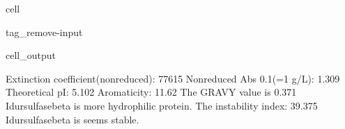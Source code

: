 \documentclass[letterpaper,10pt,english]{jupyterBook}
\begin{document}
\begin{sphinxuseclass}{cell}
\begin{sphinxuseclass}{tag_remove-input}
\begin{sphinxVerbatimOutput}
\begin{sphinxuseclass}{cell_output}
\begin{sphinxVerbatim}[commandchars=\\\{\}]
\PYGZsh{} Extinction coefficient(non\PYGZhy{}reduced): \PYGZhy{}\PYGZhy{}\PYGZhy{}\PYGZhy{}\PYGZhy{}\PYGZhy{}\PYGZhy{}\PYGZhy{}\PYGZhy{}\PYGZhy{}\PYGZhy{}\PYGZhy{}\PYGZhy{}\PYGZhy{}\PYGZhy{}\PYGZhy{}\PYGZhy{}\PYGZhy{}\PYGZhy{}\PYGZhy{}\PYGZhy{}\PYGZhy{}77615
\PYGZsh{} Non\PYGZhy{}reduced Abs 0.1\PYGZpc{}(=1 g/L): \PYGZhy{}\PYGZhy{}\PYGZhy{}\PYGZhy{}\PYGZhy{}\PYGZhy{}\PYGZhy{}\PYGZhy{}\PYGZhy{}\PYGZhy{}\PYGZhy{}\PYGZhy{}\PYGZhy{}\PYGZhy{}\PYGZhy{}\PYGZhy{}\PYGZhy{}\PYGZhy{}\PYGZhy{}\PYGZhy{}\PYGZhy{}\PYGZhy{}\PYGZhy{}\PYGZhy{}\PYGZhy{}\PYGZhy{}\PYGZhy{}\PYGZhy{}\PYGZhy{}1.309
\PYGZsh{} Theoretical pI: \PYGZhy{}\PYGZhy{}\PYGZhy{}\PYGZhy{}\PYGZhy{}\PYGZhy{}\PYGZhy{}\PYGZhy{}\PYGZhy{}\PYGZhy{}\PYGZhy{}\PYGZhy{}\PYGZhy{}\PYGZhy{}\PYGZhy{}\PYGZhy{}\PYGZhy{}\PYGZhy{}\PYGZhy{}\PYGZhy{}\PYGZhy{}\PYGZhy{}\PYGZhy{}\PYGZhy{}\PYGZhy{}\PYGZhy{}\PYGZhy{}\PYGZhy{}\PYGZhy{}\PYGZhy{}\PYGZhy{}\PYGZhy{}\PYGZhy{}\PYGZhy{}\PYGZhy{}\PYGZhy{}\PYGZhy{}\PYGZhy{}\PYGZhy{}\PYGZhy{}\PYGZhy{}\PYGZhy{}\PYGZhy{}5.102
\PYGZsh{} Aromaticity: \PYGZhy{}\PYGZhy{}\PYGZhy{}\PYGZhy{}\PYGZhy{}\PYGZhy{}\PYGZhy{}\PYGZhy{}\PYGZhy{}\PYGZhy{}\PYGZhy{}\PYGZhy{}\PYGZhy{}\PYGZhy{}\PYGZhy{}\PYGZhy{}\PYGZhy{}\PYGZhy{}\PYGZhy{}\PYGZhy{}\PYGZhy{}\PYGZhy{}\PYGZhy{}\PYGZhy{}\PYGZhy{}\PYGZhy{}\PYGZhy{}\PYGZhy{}\PYGZhy{}\PYGZhy{}\PYGZhy{}\PYGZhy{}\PYGZhy{}\PYGZhy{}\PYGZhy{}\PYGZhy{}\PYGZhy{}\PYGZhy{}\PYGZhy{}\PYGZhy{}\PYGZhy{}\PYGZhy{}\PYGZhy{}\PYGZhy{}\PYGZhy{}11.62\PYGZpc{}
\PYGZsh{} The GRAVY value is \PYGZhy{}\PYGZhy{}\PYGZhy{}\PYGZhy{}\PYGZhy{}\PYGZhy{}\PYGZhy{}\PYGZhy{}\PYGZhy{}\PYGZhy{}\PYGZhy{}\PYGZhy{}\PYGZhy{}\PYGZhy{}\PYGZhy{}\PYGZhy{}\PYGZhy{}\PYGZhy{}\PYGZhy{}\PYGZhy{}\PYGZhy{}\PYGZhy{}\PYGZhy{}\PYGZhy{}\PYGZhy{}\PYGZhy{}\PYGZhy{}\PYGZhy{}\PYGZhy{}\PYGZhy{}\PYGZhy{}\PYGZhy{}\PYGZhy{}\PYGZhy{}\PYGZhy{}\PYGZhy{}\PYGZhy{}\PYGZhy{}\PYGZhy{}\PYGZhy{}0.371
  Idursulfasebeta is more hydrophilic protein.
\PYGZsh{} The instability index: \PYGZhy{}\PYGZhy{}\PYGZhy{}\PYGZhy{}\PYGZhy{}\PYGZhy{}\PYGZhy{}\PYGZhy{}\PYGZhy{}\PYGZhy{}\PYGZhy{}\PYGZhy{}\PYGZhy{}\PYGZhy{}\PYGZhy{}\PYGZhy{}\PYGZhy{}\PYGZhy{}\PYGZhy{}\PYGZhy{}\PYGZhy{}\PYGZhy{}\PYGZhy{}\PYGZhy{}\PYGZhy{}\PYGZhy{}\PYGZhy{}\PYGZhy{}\PYGZhy{}\PYGZhy{}\PYGZhy{}\PYGZhy{}\PYGZhy{}\PYGZhy{}\PYGZhy{}39.375
  Idursulfasebeta is seems stable.
\end{sphinxVerbatim}

\end{sphinxuseclass}\end{sphinxVerbatimOutput}

\end{sphinxuseclass}
\end{sphinxuseclass}
\end{document}
